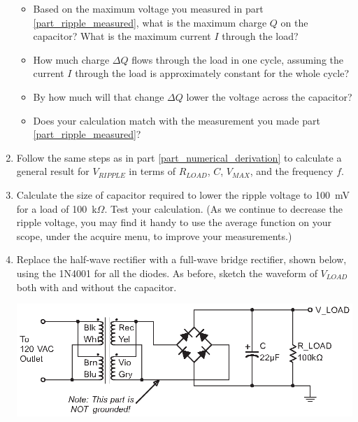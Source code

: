 \begin{enumerate}[wide]
\begin{itemize}
\item Based on the maximum voltage you measured in part \ref{part_ripple_measured}, what is the maximum charge $Q$ on the capacitor?  What is the maximum current $I$ through the load?  \label{part_numerical_derivation}

\item How much charge $\Delta Q$ flows through the load in one cycle, assuming the current $I$ through the load is approximately constant for the whole cycle?  

\item By how much will that change $\Delta Q$ lower the voltage across the capacitor?  

\item Does your calculation match with the measurement you made part \ref{part_ripple_measured}?  
\end{itemize}

\item Follow the same steps as in part \ref{part_numerical_derivation} to calculate a general result for $V_{RIPPLE}$ in terms of $R_{LOAD}$, $C$,  $V_{MAX}$, and the frequency $f$. \label{part_symbolic_derivation}

\item Calculate the size of capacitor required to lower the ripple voltage to 100~mV for a load of 100~k$\Omega$.  Test your calculation.  (As we continue to decrease the ripple voltage, you may find it handy to use the average function on your scope, under the acquire menu, to improve your measurements.)

\item Replace the half-wave rectifier with a full-wave bridge rectifier, shown below, using the 1N4001 for all the diodes.  As before, sketch the waveform of $V_{LOAD}$ both with and without the capacitor. \label{part_full_wave_bridge_rectifier}
\begin{center}
\includegraphics{power_supply/full_wave_bridge_rectifier.eps}
\end{center}


\end{enumerate}
